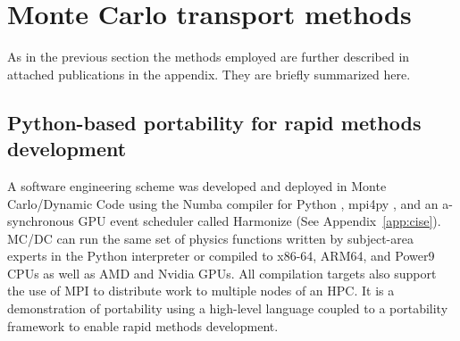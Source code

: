 


\section{Monte Carlo transport methods}
As in the previous section the methods employed are further described in attached publications in the appendix.
They are briefly summarized here.

%   
\subsection{Python-based portability for rapid methods development}

A software engineering scheme was developed and deployed in Monte Carlo/Dynamic Code \cite{morgan_monte_2024} using the Numba compiler for Python \cite{lam_numba_2015}, mpi4py \cite{mpi4py_2021}, and an a-synchronous GPU event scheduler called Harmonize \cite{brax2023} (See Appendix~\ref{app:cise}).
MC/DC can run the same set of physics functions written by subject-area experts in the Python interpreter or compiled to x86-64, ARM64, and Power9 CPUs as well as AMD and Nvidia GPUs.
All compilation targets also support the use of MPI to distribute work to multiple nodes of an HPC.
It is a demonstration of portability using a high-level language coupled to a portability framework to enable rapid methods development.

